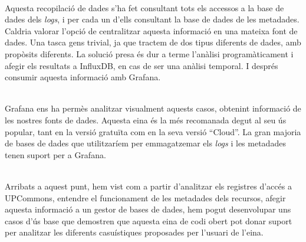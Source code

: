 \noindent \\
Aquesta recopilació de dades s'ha fet consultant tots els accessos a la base de dades dels \textit{\gls{log}s}, i per cada un d'ells consultant la base de dades de les metadades.
Caldria valorar l'opció de centralitzar aquesta informació en una mateixa font de dades.
Una tasca gens trivial, ja que tractem de dos tipus diferents de dades, amb propòsits diferents.
La solució presa és dur a terme l'anàlisi programàticament i afegir els resultats a InfluxDB, en cas de ser una anàlisi temporal.
I després consumir aquesta informació amb Grafana.

\noindent \\
Grafana ens ha permès analitzar visualment aquests casos, obtenint informació de les nostres fonts de dades.
Aquesta eina és la més recomanada degut al seu ús popular, tant en la versió gratuïta com en la seva versió “Cloud”.
La gran majoria de bases de dades que utilitzaríem per emmagatzemar els \textit{\gls{log}s} i les metadades tenen suport per a Grafana.

\noindent \\
Arribats a aquest punt, hem vist com a partir d'analitzar els registres d'accés a \gls{UPCommons}, entendre el funcionament de les metadades dels recursos, afegir aquesta informació a un gestor de bases de dades, hem pogut desenvolupar uns casos d'ús base que demostren que aquesta eina de codi obert pot donar suport per analitzar les diferents casuístiques proposades per l'usuari de l'eina.

